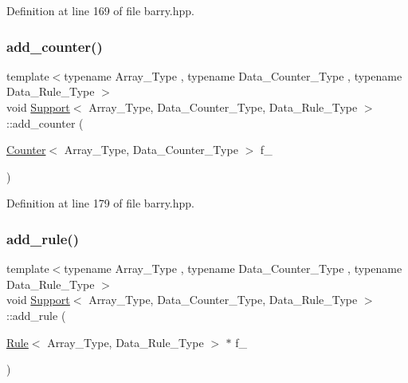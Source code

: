 Definition at line 169 of file barry.\+hpp.

\mbox{\label{classbarry_1_1_support_a00d511970c0bf833ef8bdd7580c670cc}} 
\subsubsection{\texorpdfstring{add\+\_\+counter()}{add\_counter()}\hspace{0.1cm}{\footnotesize\ttfamily [2/2]}}
{\footnotesize\ttfamily template$<$typename Array\+\_\+\+Type , typename Data\+\_\+\+Counter\+\_\+\+Type , typename Data\+\_\+\+Rule\+\_\+\+Type $>$ \\
void \hyperlink{classbarry_1_1_support}{Support}$<$ Array\+\_\+\+Type, Data\+\_\+\+Counter\+\_\+\+Type, Data\+\_\+\+Rule\+\_\+\+Type $>$\+::add\+\_\+counter (\begin{DoxyParamCaption}\item[{\hyperlink{classbarry_1_1_counter}{Counter}$<$ Array\+\_\+\+Type, Data\+\_\+\+Counter\+\_\+\+Type $>$}]{f\+\_\+ }\end{DoxyParamCaption})\hspace{0.3cm}{\ttfamily [inline]}}



Definition at line 179 of file barry.\+hpp.

\mbox{\label{classbarry_1_1_support_a3113a4586c541aa25db7b4a864b748a2}} 
\subsubsection{\texorpdfstring{add\+\_\+rule()}{add\_rule()}\hspace{0.1cm}{\footnotesize\ttfamily [1/2]}}
{\footnotesize\ttfamily template$<$typename Array\+\_\+\+Type , typename Data\+\_\+\+Counter\+\_\+\+Type , typename Data\+\_\+\+Rule\+\_\+\+Type $>$ \\
void \hyperlink{classbarry_1_1_support}{Support}$<$ Array\+\_\+\+Type, Data\+\_\+\+Counter\+\_\+\+Type, Data\+\_\+\+Rule\+\_\+\+Type $>$\+::add\+\_\+rule (\begin{DoxyParamCaption}\item[{\hyperlink{classbarry_1_1_rule}{Rule}$<$ Array\+\_\+\+Type, Data\+\_\+\+Rule\+\_\+\+Type $>$ $\ast$}]{f\+\_\+ }\end{DoxyParamCaption})\hspace{0.3cm}{\ttfamily [inline]}}



